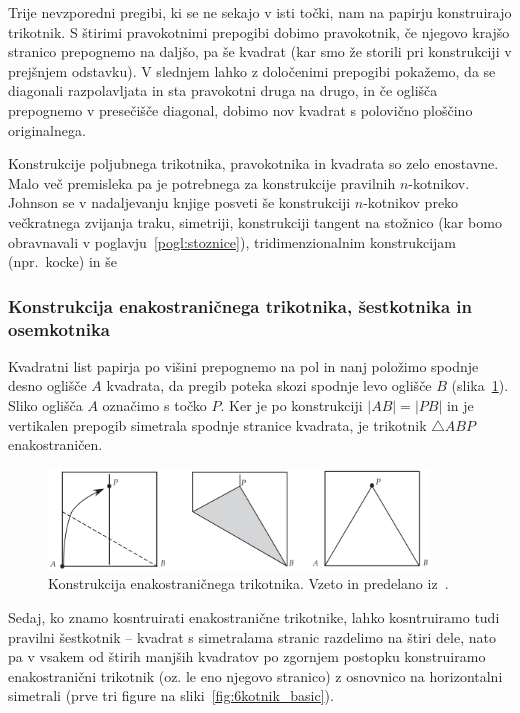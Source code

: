 Trije nevzporedni pregibi, ki se ne sekajo v isti točki, nam na papirju konstruirajo trikotnik. S štirimi pravokotnimi prepogibi dobimo pravokotnik, če njegovo krajšo stranico prepognemo na daljšo, pa še kvadrat (kar smo že storili pri konstrukciji v prejšnjem odstavku). V slednjem lahko z določenimi prepogibi pokažemo, da se diagonali razpolavljata in sta pravokotni druga na drugo, in če oglišča prepognemo v presečišče diagonal, dobimo nov kvadrat s polovično ploščino originalnega.

Konstrukcije poljubnega trikotnika, pravokotnika in kvadrata so zelo enostavne. Malo več premisleka pa je potrebnega za konstrukcije pravilnih $n$-kotnikov. Johnson se v nadaljevanju knjige posveti še konstrukciji $n$-kotnikov preko večkratnega zvijanja traku, simetriji, konstrukciji tangent na stožnico (kar bomo obravnavali v poglavju~\ref{pogl:stoznice}), tridimenzionalnim konstrukcijam (npr.\ kocke) in še

\subsubsection*{Konstrukcija enakostraničnega trikotnika, šestkotnika in osemkotnika}

Kvadratni list papirja po višini prepognemo na pol in nanj položimo spodnje desno oglišče $A$ kvadrata, da pregib poteka skozi spodnje levo oglišče $B$ (slika~\ref{fig:trik_enak_basic}). Sliko oglišča $A$ označimo s točko $P$. Ker je po konstrukciji $|AB| = |PB|$ in je vertikalen prepogib simetrala spodnje stranice kvadrata, je trikotnik $\triangle ABP$ enakostraničen.

\begin{figure}[h]
    \centering
    \includegraphics[width=0.9\textwidth]{images/n-kotniki/trik_enak_basic.png}
    \caption[Konstrukcija enakostraničnega trikotnika (način $1$)]{Konstrukcija enakostraničnega trikotnika. Vzeto in predelano iz~\cite[str. 9]{hull2013}.}
    \label{fig:trik_enak_basic}
\end{figure}

Sedaj, ko znamo kosntruirati enakostranične trikotnike, lahko kosntruiramo tudi pravilni šestkotnik -- kvadrat s simetralama stranic razdelimo na štiri dele, nato pa v vsakem od štirih manjših kvadratov po zgornjem postopku konstruiramo enakostranični trikotnik (oz. le eno njegovo stranico) z osnovnico na horizontalni simetrali (prve tri figure na sliki~\ref{fig:6kotnik_basic}).

